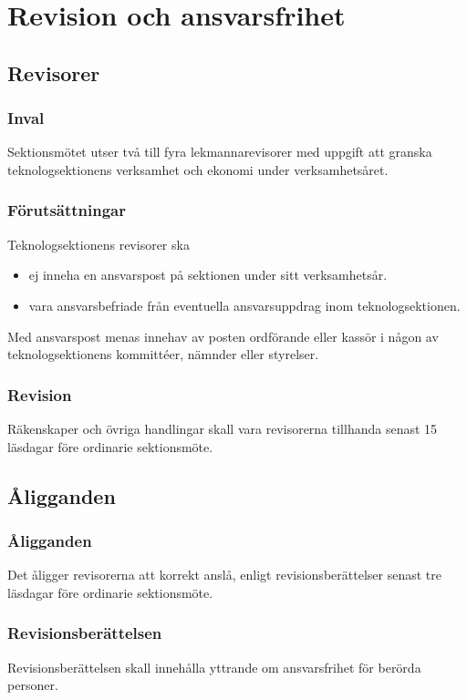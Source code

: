 \section{Revision och ansvarsfrihet}

\subsection{Revisorer}

\subsubsection{Inval}
Sektionsmötet utser två till fyra lekmannarevisorer med uppgift att granska teknologsektionens verksamhet och ekonomi under verksamhetsåret.

\subsubsection{Förutsättningar}
Teknologsektionens revisorer ska 
\begin{itemize}
    \item ej inneha en ansvarspost på sektionen under sitt verksamhetsår.
    \item vara ansvarsbefriade från eventuella ansvarsuppdrag inom teknologsektionen. 
\end{itemize} 

Med ansvarspost menas innehav av posten ordförande eller kassör i någon av teknologsektionens kommittéer, nämnder eller styrelser.

\subsubsection{Revision}
Räkenskaper och övriga handlingar skall vara revisorerna tillhanda senast 15 läsdagar före ordinarie sektionsmöte.

\subsection{Åligganden}

\subsubsection{Åligganden}
Det åligger revisorerna att korrekt anslå, enligt  revisionsberättelser senast tre läsdagar före ordinarie sektionsmöte.

\subsubsection{Revisionsberättelsen}
Revisionsberättelsen skall innehålla yttrande om ansvarsfrihet för berörda personer.

